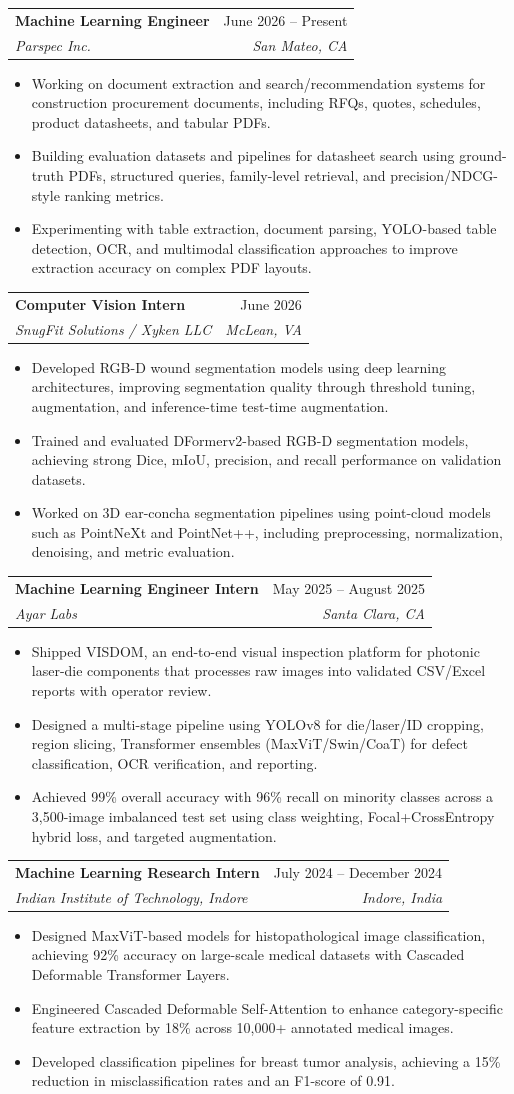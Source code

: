 \documentclass[letterpaper,11pt]{article}
\makeatletter
\newcommand{\resumeItem}[1]{
  \item\small{
    {#1 \vspace{-2pt}}
  }
}
\newcommand{\resumeSubheading}[4]{
  \vspace{-2pt}\item
    \begin{tabular*}{0.97\textwidth}[t]{l@{\extracolsep{\fill}}r}
      \textbf{#1} & #2 \\
      \textit{\small#3} & \textit{\small #4} \\
    \end{tabular*}\vspace{-7pt}
}
\newcommand{\resumeItemListStart}{\begin{itemize}}
\newcommand{\resumeItemListEnd}{\end{itemize}\vspace{-5pt}}
\makeatother
\begin{document}
\resumeSubheading
  {Machine Learning Engineer}{June 2026 -- Present}
  {Parspec Inc.}{San Mateo, CA}
  \resumeItemListStart
    \resumeItem{Working on document extraction and search/recommendation systems for construction procurement documents, including RFQs, quotes, schedules, product datasheets, and tabular PDFs.}
    \resumeItem{Building evaluation datasets and pipelines for datasheet search using ground-truth PDFs, structured queries, family-level retrieval, and precision/NDCG-style ranking metrics.}
    \resumeItem{Experimenting with table extraction, document parsing, YOLO-based table detection, OCR, and multimodal classification approaches to improve extraction accuracy on complex PDF layouts.}
  \resumeItemListEnd

\resumeSubheading
  {Computer Vision Intern}{June 2026}
  {SnugFit Solutions / Xyken LLC}{McLean, VA}
  \resumeItemListStart
    \resumeItem{Developed RGB-D wound segmentation models using deep learning architectures, improving segmentation quality through threshold tuning, augmentation, and inference-time test-time augmentation.}
    \resumeItem{Trained and evaluated DFormerv2-based RGB-D segmentation models, achieving strong Dice, mIoU, precision, and recall performance on validation datasets.}
    \resumeItem{Worked on 3D ear-concha segmentation pipelines using point-cloud models such as PointNeXt and PointNet++, including preprocessing, normalization, denoising, and metric evaluation.}
  \resumeItemListEnd

\resumeSubheading
  {Machine Learning Engineer Intern}{May 2025 -- August 2025}
  {Ayar Labs}{Santa Clara, CA}
  \resumeItemListStart
    \resumeItem{Shipped VISDOM, an end-to-end visual inspection platform for photonic laser-die components that processes raw images into validated CSV/Excel reports with operator review.}
    \resumeItem{Designed a multi-stage pipeline using YOLOv8 for die/laser/ID cropping, region slicing, Transformer ensembles (MaxViT/Swin/CoaT) for defect classification, OCR verification, and reporting.}
    \resumeItem{Achieved 99\% overall accuracy with 96\% recall on minority classes across a 3,500-image imbalanced test set using class weighting, Focal+CrossEntropy hybrid loss, and targeted augmentation.}
  \resumeItemListEnd

\resumeSubheading
  {Machine Learning Research Intern}{July 2024 -- December 2024}
  {Indian Institute of Technology, Indore}{Indore, India}
  \resumeItemListStart
    \resumeItem{Designed MaxViT-based models for histopathological image classification, achieving 92\% accuracy on large-scale medical datasets with Cascaded Deformable Transformer Layers.}
    \resumeItem{Engineered Cascaded Deformable Self-Attention to enhance category-specific feature extraction by 18\% across 10,000+ annotated medical images.}
    \resumeItem{Developed classification pipelines for breast tumor analysis, achieving a 15\% reduction in misclassification rates and an F1-score of 0.91.}
  \resumeItemListEnd
\end{document}
